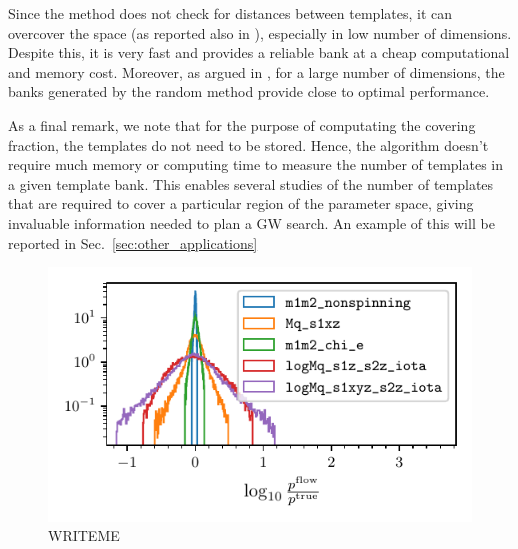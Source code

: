 \documentclass[twocolumn,showpacs,preprintnumbers,nofootinbib,prd,
superscriptaddress,10pt]{revtex4-2}
\begin{document}
Since the method does not check for distances between templates, it can overcover the space (as reported also in \cite{Messenger:2008ta, Coogan:2022qxs}), especially in low number of dimensions.
Despite this, it is very fast and provides a reliable bank at a cheap computational and memory cost.
Moreover, as argued in \cite{Messenger:2008ta, Allen:2021yuy, Allen:2022lqr}, for a large number of dimensions, the banks generated by the random method provide close to optimal performance.

As a final remark, we note that for the purpose of computating the covering fraction, the templates do not need to be stored. Hence, the algorithm doesn't require much memory or computing time to measure the number of templates in a given template bank.
This enables several studies of the number of templates that are required to cover a particular region of the parameter space, giving invaluable information needed to plan a GW search. An example of this will be reported in Sec.~\ref{sec:other_applications}

\begin{figure}[t]
	\centering
	\includegraphics[scale = 1.]{flow_validation}
	\caption{WRITEME}
	\label{fig:flow_validation}
\end{figure}
\end{document}
